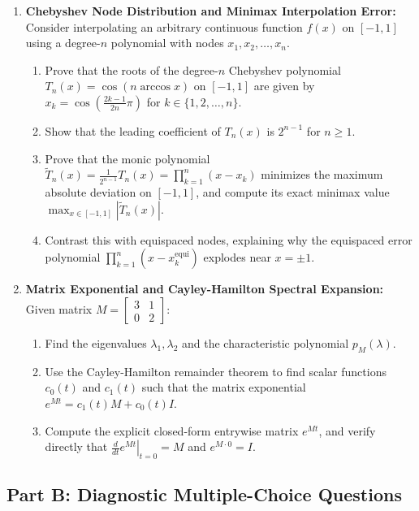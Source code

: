 \begin{enumerate}[label=\textbf{P\arabic*.}]
    \item \textbf{Chebyshev Node Distribution and Minimax Interpolation Error:}
    Consider interpolating an arbitrary continuous function $f(x)$ on $[-1, 1]$ using a degree-$n$ polynomial with nodes $x_1, x_2, \dots, x_n$.
    \begin{enumerate}[label=(\alph*)]
        \item Prove that the roots of the degree-$n$ Chebyshev polynomial $T_n(x) = \cos(n \arccos x)$ on $[-1, 1]$ are given by $x_k = \cos\left( \frac{2k-1}{2n}\pi \right)$ for $k \in \{1, 2, \dots, n\}$.
        \item Show that the leading coefficient of $T_n(x)$ is $2^{n-1}$ for $n \ge 1$.
        \item Prove that the monic polynomial $\tilde{T}_n(x) = \frac{1}{2^{n-1}}T_n(x) = \prod_{k=1}^n (x - x_k)$ minimizes the maximum absolute deviation on $[-1, 1]$, and compute its exact minimax value $\max_{x \in [-1, 1]} |\tilde{T}_n(x)|$.
        \item Contrast this with equispaced nodes, explaining why the equispaced error polynomial $\prod_{k=1}^n (x - x_k^{\text{equi}})$ explodes near $x = \pm 1$.
    \end{enumerate}

    \item \textbf{Matrix Exponential and Cayley-Hamilton Spectral Expansion:}
    Given matrix $M = \begin{bmatrix} 3 & 1 \\ 0 & 2 \end{bmatrix}$:
    \begin{enumerate}[label=(\alph*)]
        \item Find the eigenvalues $\lambda_1, \lambda_2$ and the characteristic polynomial $p_M(\lambda)$.
        \item Use the Cayley-Hamilton remainder theorem to find scalar functions $c_0(t)$ and $c_1(t)$ such that the matrix exponential $e^{Mt} = c_1(t) M + c_0(t) I$.
        \item Compute the explicit closed-form entrywise matrix $e^{Mt}$, and verify directly that $\left.\frac{d}{dt} e^{Mt}\right|_{t=0} = M$ and $e^{M \cdot 0} = I$.
    \end{enumerate}
\end{enumerate}

\subsection*{Part B: Diagnostic Multiple-Choice Questions}

